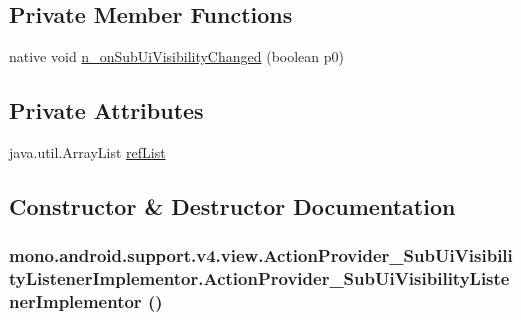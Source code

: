 \subsection*{Private Member Functions}
\begin{CompactItemize}
\item 
native void \hyperlink{classmono_1_1android_1_1support_1_1v4_1_1view_1_1_action_provider___sub_ui_visibility_listener_implementor_ae27a7e76d1d0fe5bc5aeca4e87398b7}{n\_\-onSubUiVisibilityChanged} (boolean p0)
\end{CompactItemize}
\subsection*{Private Attributes}
\begin{CompactItemize}
\item 
java.util.ArrayList \hyperlink{classmono_1_1android_1_1support_1_1v4_1_1view_1_1_action_provider___sub_ui_visibility_listener_implementor_da163f3c59554b7a5024a7bb1020e70c}{refList}
\end{CompactItemize}


\subsection{Constructor \& Destructor Documentation}
\hypertarget{classmono_1_1android_1_1support_1_1v4_1_1view_1_1_action_provider___sub_ui_visibility_listener_implementor_3ea6dee8e82881486db5aa98cbcf6fdf}{
\subsubsection[{ActionProvider\_\-SubUiVisibilityListenerImplementor}]{\setlength{\rightskip}{0pt plus 5cm}mono.android.support.v4.view.ActionProvider\_\-SubUiVisibilityListenerImplementor.ActionProvider\_\-SubUiVisibilityListenerImplementor ()}}
\label{classmono_1_1android_1_1support_1_1v4_1_1view_1_1_action_provider___sub_ui_visibility_listener_implementor_3ea6dee8e82881486db5aa98cbcf6fdf}




